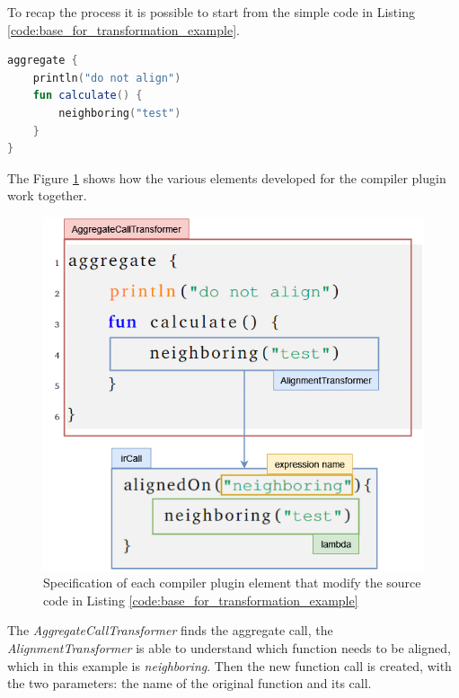 To recap the process it is possible to start from the simple code in Listing \ref{code:base_for_transformation_example}.
\begin{lstlisting}[caption={Base example of aggregate program}, captionpos=b, language=Kotlin, label={code:base_for_transformation_example}]
aggregate {
    println("do not align")
    fun calculate() {
        neighboring("test")
    }
}
\end{lstlisting}
The Figure \ref{fig:ir_trasformation_with_code_elements} shows how the various elements developed for the compiler plugin work together.
\begin{figure}[!ht]
    \centering
    \includegraphics[scale=0.65]{document/chapters/3-alignment/images/ir_trasformation_with_code_elements.png}
    \caption{Specification of each compiler plugin element that modify the source code in Listing \ref{code:base_for_transformation_example}}
    \label{fig:ir_trasformation_with_code_elements}
\end{figure}
The \textit{AggregateCallTransformer} finds the aggregate call, the \textit{AlignmentTransformer} is able to understand which function needs to be aligned, which in this example is \textit{neighboring}. Then the new function call is created, with the two parameters: the name of the original function and its call.

